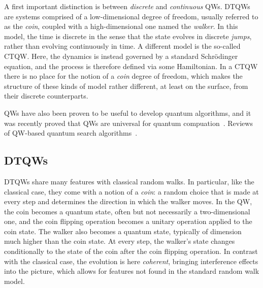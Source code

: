 A first important distinction is between \textit{discrete} and \textit{continuous} \acp{QW}.
\acp{DTQW} are systems comprised of a low-dimensional degree of freedom, usually referred to as the \textit{coin}, coupled with a high-dimensional one named the \textit{walker}.
In this model, the time is discrete in the sense that the state evolves in discrete \textit{jumps}, rather than evolving continuously in time.
A different model is the so-called \ac{CTQW}. Here, the dynamics is instead governed by a standard Schr\"odinger equation, and the process is therefore defined via some Hamiltonian. In a \ac{CTQW} there is no place for the notion of a \textit{coin} degree of freedom, which makes the structure of these kinds of model rather different, at least on the surface, from their discrete counterparts.

\acp{QW} have also been proven to be useful to develop quantum algorithms, and it was recently proved that \acp{QW} are universal for quantum compuation~\cite{childs2009universal,childs2003exponential,lovett2010universal,lovett2018quantum,underwood2010universal}.
Reviews of QW-based quantum search algorithms~\cite{ambainis2011search,ambainis2008quantum,ambainis2010developments,kempe2003quantum,kendon2006random,santha2008quantum,venegasandraca2012quantum,venegasandraca2008quantum}.

\subsection{DTQWs}

\acp{DTQW} share many features with classical random walks.
In particular, like the classical case, they come with a notion of a \textit{coin}: a random choice that is made at every step and determines the direction in which the walker moves.
In the \ac{QW}, the coin becomes a quantum state, often but not necessarily a two-dimensional one, and the coin flipping operation becomes a unitary operation applied to the coin state.
The walker also becomes a quantum state, typically of dimension much higher than the coin state. At every step, the walker's state changes conditionally to the state of the coin after the coin flipping operation.
In contrast with the classical case, the evolution is here \textit{coherent}, bringing interference effects into the picture, which allows for features not found in the standard random walk model.

